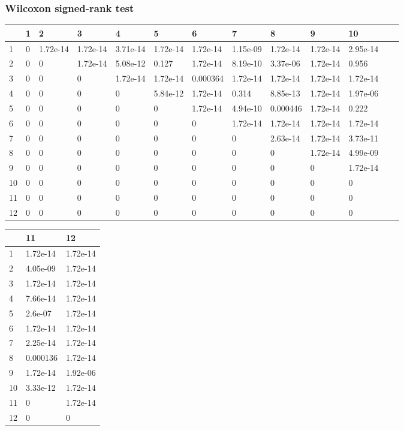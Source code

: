 \newpage

\subsubsection{Wilcoxon signed-rank test}

\begin{table}[h]
\begin{tabular}{|l||l|l|l|l|l|l|l|l|l|l|l|l|}
\hline
 & 1 & 2 & 3 & 4 & 5 & 6 & 7 & 8 & 9 & 10 \\ \hline
\hline
1 & 0 & 1.72e-14 & 1.72e-14 & 3.71e-14 & 1.72e-14 & 1.72e-14 & 1.15e-09 & 1.72e-14 & 1.72e-14 & 2.95e-14 \\ \hline
2 & 0 & 0 & 1.72e-14 & 5.08e-12 & 0.127 & 1.72e-14 & 8.19e-10 & 3.37e-06 & 1.72e-14 & 0.956 \\ \hline
3 & 0 & 0 & 0 & 1.72e-14 & 1.72e-14 & 0.000364 & 1.72e-14 & 1.72e-14 & 1.72e-14 & 1.72e-14 \\ \hline
4 & 0 & 0 & 0 & 0 & 5.84e-12 & 1.72e-14 & 0.314 & 8.85e-13 & 1.72e-14 & 1.97e-06 \\ \hline
5 & 0 & 0 & 0 & 0 & 0 & 1.72e-14 & 4.94e-10 & 0.000446 & 1.72e-14 & 0.222 \\ \hline
6 & 0 & 0 & 0 & 0 & 0 & 0 & 1.72e-14 & 1.72e-14 & 1.72e-14 & 1.72e-14 \\ \hline
7 & 0 & 0 & 0 & 0 & 0 & 0 & 0 & 2.63e-14 & 1.72e-14 & 3.73e-11 \\ \hline
8 & 0 & 0 & 0 & 0 & 0 & 0 & 0 & 0 & 1.72e-14 & 4.99e-09 \\ \hline
9 & 0 & 0 & 0 & 0 & 0 & 0 & 0 & 0 & 0 & 1.72e-14 \\ \hline
10 & 0 & 0 & 0 & 0 & 0 & 0 & 0 & 0 & 0 & 0 \\ \hline
11 & 0 & 0 & 0 & 0 & 0 & 0 & 0 & 0 & 0 & 0 \\ \hline
12 & 0 & 0 & 0 & 0 & 0 & 0 & 0 & 0 & 0 & 0 \\ \hline
\end{tabular}
\end{table}

\begin{table}[h]
\begin{tabular}{|l||l|l|}
\hline
 & 11 & 12 \\ \hline
\hline
1 & 1.72e-14 & 1.72e-14 \\ \hline
2 & 4.05e-09 & 1.72e-14 \\ \hline
3 & 1.72e-14 & 1.72e-14 \\ \hline
4 & 7.66e-14 & 1.72e-14 \\ \hline
5 & 2.6e-07 & 1.72e-14 \\ \hline
6 & 1.72e-14 & 1.72e-14 \\ \hline
7 & 2.25e-14 & 1.72e-14 \\ \hline
8 & 0.000136 & 1.72e-14 \\ \hline
9 & 1.72e-14 & 1.92e-06 \\ \hline
10 & 3.33e-12 & 1.72e-14 \\ \hline
11 & 0 & 1.72e-14 \\ \hline
12 & 0 & 0 \\ \hline
\end{tabular}
\end{table}

\newpage
